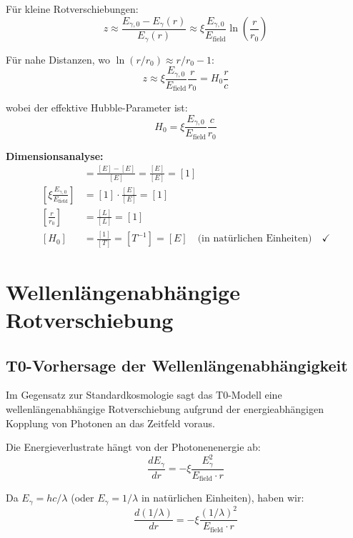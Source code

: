 \documentclass[12pt,a4paper]{report}
\begin{document}
	Für kleine Rotverschiebungen:
	\begin{equation}
		z \approx \frac{E_{\gamma,0} - E_\gamma(r)}{E_\gamma(r)} \approx \xi \frac{E_{\gamma,0}}{E_{\text{field}}} \ln\left(\frac{r}{r_0}\right)
	\end{equation}
	
	Für nahe Distanzen, wo $\ln(r/r_0) \approx r/r_0 - 1$:
	\begin{equation}
		z \approx \xi \frac{E_{\gamma,0}}{E_{\text{field}}} \frac{r}{r_0} = H_0 \frac{r}{c}
	\end{equation}
	
	wobei der effektive Hubble-Parameter ist:
	\begin{equation}
		H_0 = \xi \frac{E_{\gamma,0}}{E_{\text{field}}} \frac{c}{r_0}
	\end{equation}
	
	\textbf{Dimensionsanalyse:}
	\begin{align}
		[z] &= \frac{[E] - [E]}{[E]} = \frac{[E]}{[E]} = [1] \\
		\left[\xi \frac{E_{\gamma,0}}{E_{\text{field}}}\right] &= [1] \cdot \frac{[E]}{[E]} = [1] \\
		\left[\frac{r}{r_0}\right] &= \frac{[L]}{[L]} = [1] \\
		[H_0] &= \frac{[1]}{[T]} = [T^{-1}] = [E] \quad \text{(in natürlichen Einheiten)} \quad \checkmark
	\end{align}
	
	\section{Wellenlängenabhängige Rotverschiebung}
	\label{sec:wavelength_dependent_redshift}
	
\subsection{T0-Vorhersage der Wellenlängenabhängigkeit}
\label{subsec:t0_wavelength_dependence}

Im Gegensatz zur Standardkosmologie sagt das T0-Modell eine wellenlängenabhängige Rotverschiebung aufgrund der energieabhängigen Kopplung von Photonen an das Zeitfeld voraus.

Die Energieverlustrate hängt von der Photonenenergie ab:
\begin{equation}
	\frac{dE_\gamma}{dr} = -\xi \frac{E_\gamma^2}{E_{\text{field}} \cdot r}
\end{equation}

Da $E_\gamma = hc/\lambda$ (oder $E_\gamma = 1/\lambda$ in natürlichen Einheiten), haben wir:
\begin{equation}
	\frac{d(1/\lambda)}{dr} = -\xi \frac{(1/\lambda)^2}{E_{\text{field}} \cdot r}
\end{equation}
\end{document}
